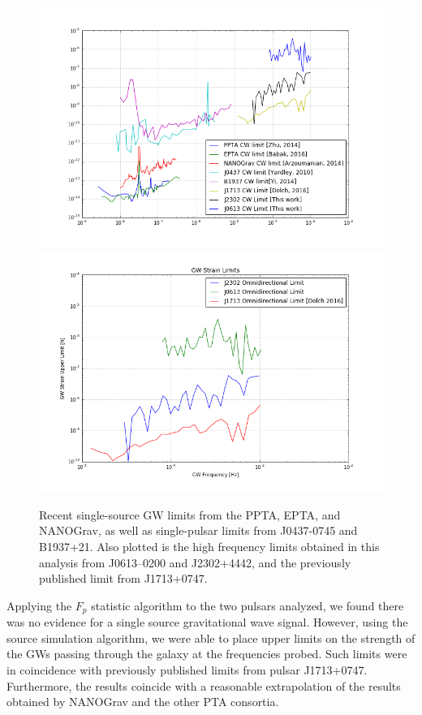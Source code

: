 \documentclass[12pt]{article}
\begin{document}
\begin{figure}
    \caption{Recent single-source GW limits from the PPTA, EPTA, and NANOGrav,
as well as single-pulsar limits from J0437-0745 and B1937+21. Also plotted is
the high frequency limits obtained in this analysis from J0613--0200 and
J2302+4442, and the previously published limit from J1713+0747.}
    \includegraphics[width=1\textwidth]{./figures/all_limits.png}
    \includegraphics[width=1\textwidth]{./figures/hf_limits.png}
\end{figure}

Applying the $F_p$ statistic algorithm to the two pulsars analyzed, we found
there was no evidence for a single source gravitational wave signal. However,
using the source simulation algorithm, we were able to place upper limits on the
strength of the GWs passing through the galaxy at the
frequencies probed. Such limits were in coincidence with previously published
limits from pulsar J1713+0747. Furthermore, the results coincide with a
reasonable extrapolation of the results obtained by NANOGrav and the other PTA
consortia.
\end{document}
